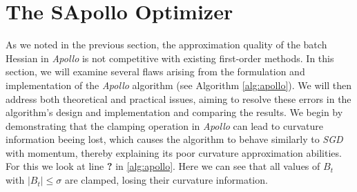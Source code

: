  
\section{The SApollo Optimizer}
As we noted in the previous section, the approximation quality of the batch Hessian in \emph{Apollo} is not competitive with existing first-order methods.
In this section, we will examine several flaws arising from the formulation and implementation of the \emph{Apollo} algorithm (see Algorithm \ref{alg:apollo}).
We will then address both theoretical and practical issues, aiming to resolve these errors in the algorithm's design and implementation and comparing
the results.
We begin by demonstrating that the clamping operation in \emph{Apollo} can lead to curvature information beeing lost,
which causes the algorithm to behave similarly to \emph{SGD} with momentum, thereby explaining its poor curvature approximation abilities.\\
For this we look at line \textbf{?} in \ref{alg:apollo}. Here we can see that all values of $B_t$ with $|B_t| \le \sigma$ are clamped,
losing their curvature information. 

